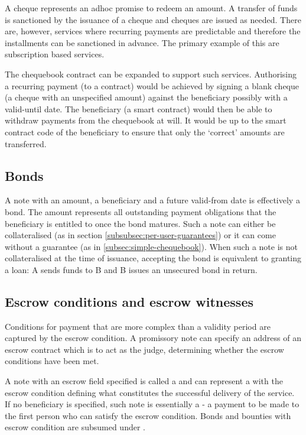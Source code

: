 A cheque represents an adhoc promise to redeem an amount. A transfer of funds is sanctioned by the issuance of a cheque and cheques are issued as needed. There are, however, services where recurring payments are predictable and therefore the installments can be sanctioned in advance. The primary example of this are subscription based services. 

The chequebook contract can be expanded to support such services. Authorising a recurring payment (to a contract) would be achieved by signing a blank cheque (a cheque with an unspecified amount) against the beneficiary possibly with a valid-until date. The beneficiary (a smart contract) would then be able to withdraw payments from the chequebook at will. It would be up to the smart contract code of the beneficiary to ensure that only the `correct' amounts are transferred. 

\subsection{Bonds}

A note with an amount, a beneficiary and a future valid-from date is effectively a bond. The amount represents all outstanding payment obligations that the beneficiary is entitled to once the bond matures. Such a note can either be collateralised (as in section \ref{subsubsec:per-user-guarantees}) or it can come without a guarantee (as in \ref{subsec:simple-chequebook}). When such a note is not collateralised at the time of issuance, accepting the bond is equivalent to granting a loan: A sends funds to B and B issues an unsecured bond in return.


\subsection{Escrow conditions and escrow witnesses}

Conditions for payment that are more complex than a validity period are captured by the escrow condition. A promissory note can specify an address of an escrow contract which is to act as the judge, determining whether the escrow conditions have been met.

A note with an escrow field specified is called a  and can represent a  with the escrow condition defining what constitutes the successful delivery of the service. 
If no beneficiary is specified, such note is essentially a  - a payment to be made to the first person who can satisfy the escrow condition. 
Bonds and bounties with escrow condition are subsumed under .

